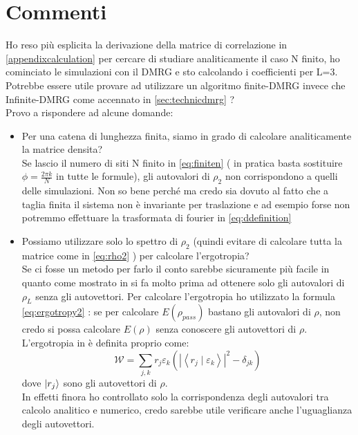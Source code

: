 \documentclass[10pt,a4paper]{article}
\begin{document}
\section{Commenti}
Ho reso più esplicita la derivazione della matrice di correlazione in \ref{appendixcalculation} per cercare di studiare analiticamente il caso N finito, ho cominciato le simulazioni con il DMRG e sto calcolando i coefficienti per L=3. Potrebbe essere utile provare ad utilizzare un algoritmo finite-DMRG invece che Infinite-DMRG come accennato in \ref{sec:technicdmrg} ?\\
Provo a rispondere ad alcune domande:
\begin{itemize}
\item  Per una catena di lunghezza finita, siamo in grado di calcolare analiticamente la matrice densita? \\
Se lascio il numero di siti N finito in \ref{eq:finiten} ( in pratica basta sostituire $\phi=\frac{2\pi k}{N}$ in tutte le formule), gli autovalori di $\rho_2$ non corrispondono a quelli delle simulazioni. Non so bene perché ma credo sia dovuto al fatto che a taglia finita il sistema non è invariante per traslazione e ad esempio forse non potremmo effettuare la trasformata di fourier in \ref{eq:ddefinition}
\item  Possiamo utilizzare solo lo spettro di $\rho_2$ (quindi evitare di calcolare tutta la matrice come in \ref{eq:rho2} ) per calcolare l'ergotropia?\\
 Se ci fosse un metodo per farlo il conto sarebbe sicuramente più facile in quanto come mostrato in \cite{latorre2003ground} si fa molto prima ad ottenere solo gli autovalori di $\rho_L$ senza gli autovettori. Per calcolare l'ergotropia ho utilizzato la formula \ref{eq:ergotropy2} : se per calcolare $E(\rho_{pass})$ bastano gli autovalori di $\rho$, non credo si possa calcolare $E(\rho)$ senza conoscere gli autovettori di $\rho$. L'ergotropia in \cite{allahverdyan2004maximal} è definita proprio come: \begin{equation}\mathcal{W}=\sum_{j, k} r_{j} \varepsilon_{k}\left(\left|\left\langle r_{j} \mid \varepsilon_{k}\right\rangle\right|^{2}-\delta_{j k}\right)\end{equation} 
dove $\ket{r_j}$ sono gli autovettori di $\rho$.\\
In effetti finora ho controllato solo la corrispondenza degli autovalori tra calcolo analitico e numerico, credo sarebbe utile verificare anche l'uguaglianza degli autovettori.


\end{itemize}
\end{document}
